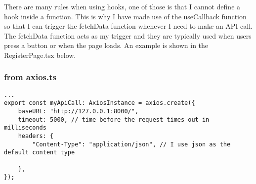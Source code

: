There are many rules when using hooks, one of those is that I cannot define a hook inside a function. This is why I have made use of the useCallback function so that I can trigger the fetchData function whenever I need to make an API call. The fetchData function acts as my trigger and they are typically used when users press a button or when the page loads. An example is shown in the RegisterPage.tsx below.

\subsubsection{from axios.ts}
\begin{verbatim}
...
export const myApiCall: AxiosInstance = axios.create({
    baseURL: "http://127.0.0.1:8000/", 
    timeout: 5000, // time before the request times out in milliseconds
    headers: {
        "Content-Type": "application/json", // I use json as the default content type 
        
    },
});
\end{verbatim}

